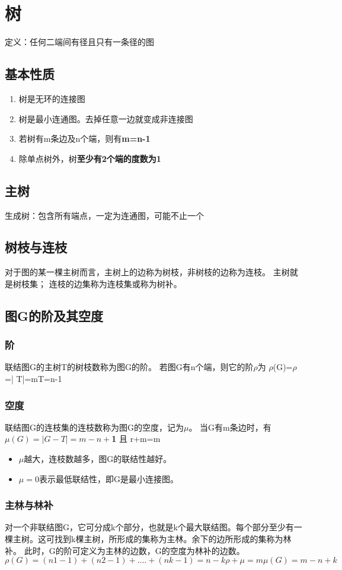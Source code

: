 \section{树}
定义：任何二端间有径且只有一条径的图
\subsection{基本性质}
\begin{enumerate}
	\item 树是无环的连接图
	\item 树是最小连通图。去掉任意一边就变成非连接图
	\item 若树有m条边及n个端，则有\textbf{m=n-1}
	\item 除单点树外，树\textbf{至少有2个端的度数为1}
\end{enumerate}
\subsection{主树}
生成树：包含所有端点，一定为连通图，可能不止一个
\subsection{树枝与连枝}
对于图的某一棵主树而言，主树上的边称为树枝，非树枝的边称为连枝。
主树就是树枝集；
连枝的边集称为连枝集或称为树补。
\subsection{图G的阶及其空度
}
\subsubsection{阶}
联结图G的主树T的树枝数称为图G的阶。
若图G有n个端，则它的阶$ \rho $为
$ \rho $(G)=$ \rho$=| T|=mT=n-1
\subsubsection{空度}
联结图G的连枝集的连枝数称为图G的空度，记为$ \mu $。
当G有m条边时，有\textbf{$  \mu(G)=|G-T|=m-n+ $1} 且 r+m=m
\begin{itemize}
	\item $ \mu $越大，连枝数越多，图G的联结性越好。
	\item $ \mu = 0 $表示最低联结性，即G是最小连接图。
\end{itemize}
\subsubsection{主林与林补}
对一个非联结图G，它可分成k个部分，也就是k个最大联结图。每个部分至少有一棵主树。这可找到k棵主树，所形成的集称为主林。余下的边所形成的集称为林补。
此时，G的阶可定义为主林的边数，G的空度为林补的边数。
\[ 
\rho(G)=(n1-1)+(n2-1)+….+(nk-1)=n-k
\rho+\mu=m
\mu(G)=m-n+k
\]
